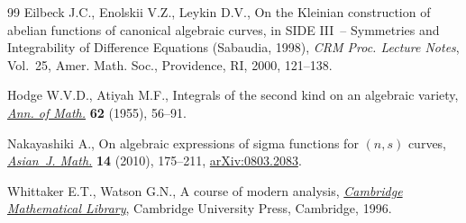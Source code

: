 \documentclass[11pt]{article}
\numberwithin{equation}{section}
\begin{document}
\begin{thebibliography}{99}
Eilbeck J.C., Enolskii V.Z., Leykin D.V., On the {K}leinian construction of
 abelian functions of canonical algebraic curves, in S{IDE} {III}~--
 Symmetries and Integrability of Difference Equations ({S}abaudia, 1998),
 \textit{CRM Proc. Lecture Notes}, Vol.~25, Amer. Math. Soc., Providence, RI,
 2000, 121--138.

Hodge W.V.D., Atiyah M.F., Integrals of the second kind on an algebraic
 variety, \href{https://doi.org/10.2307/2007100}{\textit{Ann. of Math.}} \textbf{62} (1955), 56--91.

Nakayashiki A., On algebraic expressions of sigma functions for {$(n,s)$}
 curves, \href{https://doi.org/10.4310/AJM.2010.v14.n2.a2}{\textit{Asian~J. Math.}} \textbf{14} (2010), 175--211,
 \href{https://arxiv.org/abs/0803.2083}{arXiv:0803.2083}.

Whittaker E.T., Watson G.N., A course of modern analysis, \href{https://doi.org/10.1017/CBO9780511608759}{\textit{Cambridge
 Mathematical Library}}, Cambridge University Press, Cambridge, 1996.

\end{thebibliography}
\end{document}
